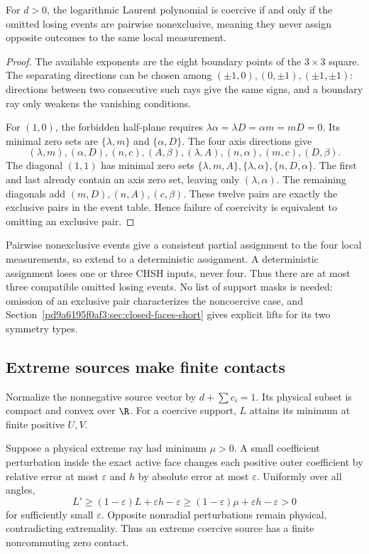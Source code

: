 \begin{proposition}\label{p0c8f420148b7:prop:compat}
For $d>0$, the logarithmic Laurent polynomial is coercive if and only if the omitted losing events are pairwise nonexclusive, meaning they never assign opposite outcomes to the same local measurement.
\end{proposition}
\begin{proof}
The available exponents are the eight boundary points of the $3\times3$ square. The separating directions can be chosen among $(\pm1,0),(0,\pm1),(\pm1,\pm1)$: directions between two consecutive such rays give the same signs, and a boundary ray only weakens the vanishing conditions.

For $(1,0)$, the forbidden half-plane requires
$\lambda\alpha=\lambda D=\alpha m=mD=0$. Its minimal zero sets are $\{\lambda,m\}$ and $\{\alpha,D\}$. The four axis directions give
\[
(\lambda,m),(\alpha,D),(n,c),(A,\beta),
(\lambda,A),(n,\alpha),(m,c),(D,\beta).
\]
The diagonal $(1,1)$ has minimal zero sets
$\{\lambda,m,A\},\{\lambda,\alpha\},\{n,D,\alpha\}$.
The first and last already contain an axis zero set, leaving only $(\lambda,\alpha)$. The remaining diagonals add $(m,D),(n,A),(c,\beta)$. These twelve pairs are exactly the exclusive pairs in the event table. Hence failure of coercivity is equivalent to omitting an exclusive pair.
\end{proof}

Pairwise nonexclusive events give a consistent partial assignment to the four local measurements, so extend to a deterministic assignment. A deterministic assignment loses one or three CHSH inputs, never four. Thus there are at most three compatible omitted losing events. No list of support masks is needed: omission of an exclusive pair characterizes the noncoercive case, and Section~\ref{pd9a6195f0af3:sec:closed-faces-short} gives explicit lifts for its two symmetry types.

\subsection{Extreme sources make finite contacts}
Normalize the nonnegative source vector by $d+\sum c_i=1$. Its physical subset is compact and convex over $\R$. For a coercive support, $L$ attains its minimum at finite positive $U,V$.

Suppose a physical extreme ray had minimum $\mu>0$. A small coefficient perturbation inside the exact active face changes each positive outer coefficient by relative error at most $\varepsilon$ and $h$ by absolute error at most $\varepsilon$. Uniformly over all angles,
\[L'\ge(1-\varepsilon)L+\varepsilon h-\varepsilon
\ge(1-\varepsilon)\mu+\varepsilon h-\varepsilon>0
\]
for sufficiently small $\varepsilon$. Opposite nonradial perturbations remain physical, contradicting extremality. Thus an extreme coercive source has a finite noncommuting zero contact.

